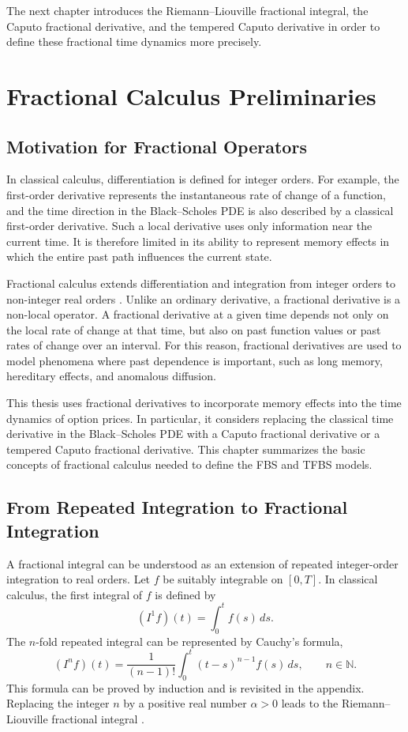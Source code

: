 \documentclass[11pt,a4paper]{report}
\begin{document}
The next chapter introduces the Riemann--Liouville fractional integral, the Caputo fractional derivative, and the tempered Caputo derivative in order to define these fractional time dynamics more precisely.

\chapter{Fractional Calculus Preliminaries}

\section{Motivation for Fractional Operators}

In classical calculus, differentiation is defined for integer orders. For example, the first-order derivative represents the instantaneous rate of change of a function, and the time direction in the Black--Scholes PDE is also described by a classical first-order derivative. Such a local derivative uses only information near the current time. It is therefore limited in its ability to represent memory effects in which the entire past path influences the current state.

Fractional calculus extends differentiation and integration from integer orders to non-integer real orders \cite{Podlubny1999}. Unlike an ordinary derivative, a fractional derivative is a non-local operator. A fractional derivative at a given time depends not only on the local rate of change at that time, but also on past function values or past rates of change over an interval. For this reason, fractional derivatives are used to model phenomena where past dependence is important, such as long memory, hereditary effects, and anomalous diffusion.

This thesis uses fractional derivatives to incorporate memory effects into the time dynamics of option prices. In particular, it considers replacing the classical time derivative in the Black--Scholes PDE with a Caputo fractional derivative or a tempered Caputo fractional derivative. This chapter summarizes the basic concepts of fractional calculus needed to define the FBS and TFBS models.

\section{From Repeated Integration to Fractional Integration}

A fractional integral can be understood as an extension of repeated integer-order integration to real orders. Let $f$ be suitably integrable on $[0,T]$. In classical calculus, the first integral of $f$ is defined by
\[
(I^1 f)(t)
=
\int_0^t f(s)\,ds.
\]
The $n$-fold repeated integral can be represented by Cauchy's formula,
\[
(I^n f)(t)
=
\frac{1}{(n-1)!}
\int_0^t
(t-s)^{n-1}f(s)\,ds,
\qquad n\in\mathbb{N}.
\]
This formula can be proved by induction and is revisited in the appendix. Replacing the integer $n$ by a positive real number $\alpha>0$ leads to the Riemann--Liouville fractional integral \cite{Podlubny1999}.
\end{document}
